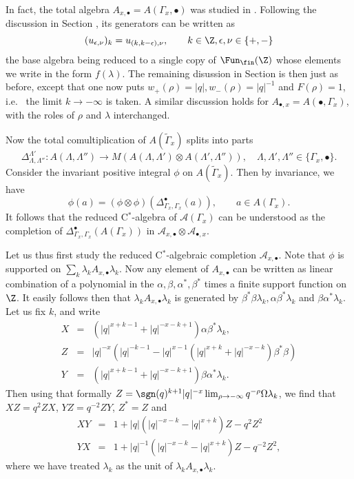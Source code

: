 In fact, the total algebra $A_{x,\bullet} = A(\Gamma_x,\bullet)$ was studied in \cite{DCY1}. Following the discussion in Section \cite{SecUni}, its generators can be written as \[(u_{\epsilon,\nu})_{k} =  u_{(k,k-\epsilon),\nu}, \qquad k\in \Z,\epsilon,\nu \in \{+,-\}\] the base algebra being reduced to a single copy of $\Fun_{\fin}(\Z)$ whose elements we write in the form $f(\lambda)$. The remaining disussion in Section \cite{SecUni} is then just as before, except that one now puts $w_+(\rho) = |q|, w_-(\rho) = |q|^{-1}$ and $F(\rho) =1$, i.e.~ the limit $k\rightarrow -\infty$ is taken. A similar discussion holds for $A_{\bullet,x} = A(\bullet,\Gamma_x)$, with the roles of $\rho$ and $\lambda$ interchanged. 

Now the total comultiplication of $A(\widetilde{\Gamma}_x)$ splits into parts \[\Delta_{\Lambda,\Lambda''}^{\Lambda'}: A(\Lambda,\Lambda'')\rightarrow M(A(\Lambda,\Lambda')\otimes A(\Lambda',\Lambda'')),\quad \Lambda,\Lambda',\Lambda'' \in \{\Gamma_x,\bullet\}.\] Consider the invariant positive integral $\phi$ on $A(\widetilde{\Gamma}_x)$. Then by invariance, we have \[\phi(a) = (\phi\otimes \phi)(\Delta_{\Gamma_x,\Gamma_x}^{\bullet}(a)),\qquad a \in A(\Gamma_x).\] It follows that the reduced C$^*$-algebra of $\mathcal{A}(\Gamma_x)$ can be understood as the completion of $\Delta_{\Gamma_x,\Gamma_x}^{\bullet}(A(\Gamma_x))$ in $\mathcal{A}_{x,\bullet}\otimes \mathcal{A}_{\bullet,x}$. 

Let us thus first study the reduced C$^*$-algebraic completion $\mathcal{A}_{x,\bullet}$. Note that $\phi$ is supported on $\sum_k \lambda_k A_{x,\bullet}\lambda_k$. Now any element of $A_{x,\bullet}$ can be written as linear combination of a polynomial in the $\alpha,\beta,\alpha^*,\beta^*$ times a finite support function on $\Z$. It easily follows then that $\lambda_k A_{x,\bullet}\lambda_k$ is generated by $\beta^*\beta\lambda_k,\alpha\beta^*\lambda_k$ and $\beta\alpha^*\lambda_k$. Let us fix $k$, and write \begin{eqnarray*} X &=& (|q|^{x+k-1}+|q|^{-x-k+1})\alpha \beta^*\lambda_k,\\ Z &=& |q|^{-x}(|q|^{-k-1}-|q|^{x-1}(|q|^{x+k}+|q|^{-x-k})\beta^*\beta)\\ 
Y &=& (|q|^{x+k-1}+|q|^{-x-k+1})\beta \alpha^*\lambda_k.\end{eqnarray*}  Then using that formally $Z = \sgn(q)^{k+1}|q|^{-x} \lim_{\rho\rightarrow -\infty} q^{-\rho}\Omega \lambda_k$, we find that $XZ = q^2ZX$, $YZ = q^{-2}ZY$, $Z^*=Z$ and \begin{eqnarray*} XY &=& 1+ |q| (|q|^{-x-k}-|q|^{x+k})Z -  q^2 Z^2 \\ YX &=& 1+ |q|^{-1}(|q|^{-x-k}-|q|^{x+k})Z-q^{-2}Z^2,
\end{eqnarray*}
where we have treated $\lambda_k$ as the unit of $\lambda_k A_{x,\bullet}\lambda_k$.

